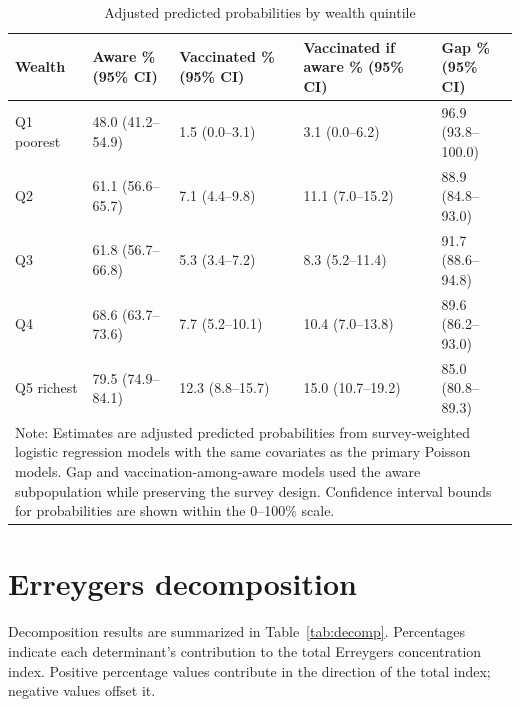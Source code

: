 \begin{table}[H]
\caption{Adjusted predicted probabilities by wealth quintile}
\centering
\small
\setlength{\tabcolsep}{2pt}
\begin{tabular}{|p{2.1cm}|p{2.45cm}|p{2.45cm}|p{2.65cm}|p{2.45cm}|}
\hline
\textbf{Wealth} & \textbf{Aware \% (95\% CI)} & \textbf{Vaccinated \% (95\% CI)} & \textbf{Vaccinated if aware \% (95\% CI)} & \textbf{Gap \% (95\% CI)} \\
\hline
Q1 poorest & 48.0 (41.2--54.9) & 1.5 (0.0--3.1) & 3.1 (0.0--6.2) & 96.9 (93.8--100.0) \\
Q2 & 61.1 (56.6--65.7) & 7.1 (4.4--9.8) & 11.1 (7.0--15.2) & 88.9 (84.8--93.0) \\
Q3 & 61.8 (56.7--66.8) & 5.3 (3.4--7.2) & 8.3 (5.2--11.4) & 91.7 (88.6--94.8) \\
Q4 & 68.6 (63.7--73.6) & 7.7 (5.2--10.1) & 10.4 (7.0--13.8) & 89.6 (86.2--93.0) \\
Q5 richest & 79.5 (74.9--84.1) & 12.3 (8.8--15.7) & 15.0 (10.7--19.2) & 85.0 (80.8--89.3) \\
\hline
\multicolumn{5}{|p{12.1cm}|}{\footnotesize Note: Estimates are adjusted predicted probabilities from survey-weighted logistic regression models with the same covariates as the primary Poisson models. Gap and vaccination-among-aware models used the aware subpopulation while preserving the survey design. Confidence interval bounds for probabilities are shown within the 0--100\% scale.} \\
\hline
\end{tabular}
\label{tab:predicted_wealth}
\end{table}

\section{Erreygers decomposition}

Decomposition results are summarized in Table~\ref{tab:decomp}. Percentages indicate each determinant's contribution to the total Erreygers concentration index. Positive percentage values contribute in the direction of the total index; negative values offset it.


